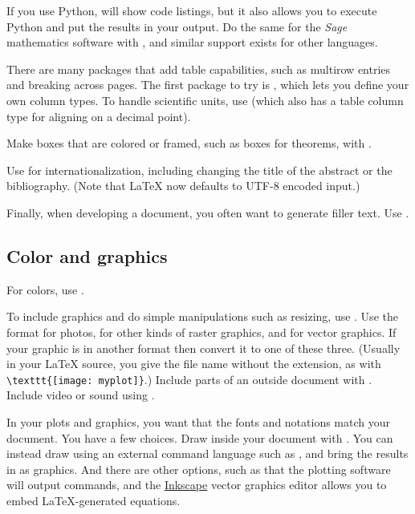 \documentclass[11pt]{article}
\begin{document}
\begin{multicols*}{2}
If you use Python, 
will show code listings, but it also allows you to execute
Python and put the results in your output.
Do the same for 
the \textit{Sage} mathematics software with 
, %
and similar support exists for other languages.

There are many packages that add table capabilities, such as
multirow entries and breaking across pages.
The first package to try is , 
which lets you define your own column
types.
To handle scientific units, 
use  
(which also has a table column type for aligning on a decimal point).

Make boxes that are colored or framed, such as boxes for theorems,
with
.

Use  
for internationalization, including changing the 
title of the abstract or the bibliography.
(Note that \LaTeX{} now defaults to UTF-8 encoded input.)

Finally, when developing a document, you often want to 
generate filler text.
Use 
.



\subsection{Color and graphics}
For colors, use 
.

To include graphics and do simple manipulations such as resizing, 
use .
Use the  format for photos,
 for other kinds of raster graphics,
and \PDF{} for vector graphics.
If your graphic is in another format then convert it to one of these three.
(Usually in your \LaTeX{} source, you give the file name without the extension,
as with \lstinline!\texttt{[image: myplot]}!.)
Include parts of an outside \PDF{} document with
.
Include video or sound using
.

In your plots and graphics, you want that
the fonts and notations match your document.
You have a few choices.  
Draw inside your document with 
\href{https://ctan.org/pkg/pgf}{\TikZ}.
You can instead draw using an external command language such as 
\href{https://asymptote.sourceforge.io/}{\Asymptote{}},
and bring the results in as graphics.
And there are other options, such as that the
\href{http://www.gnuplot.info/}{\gnuplot{}} plotting software
will output \TikZ{} commands,
and the  
\href{https://inkscape.org/}{Inkscape} vector graphics editor allows
you to embed \LaTeX{}-generated equations.



\end{multicols*}
\end{document}
